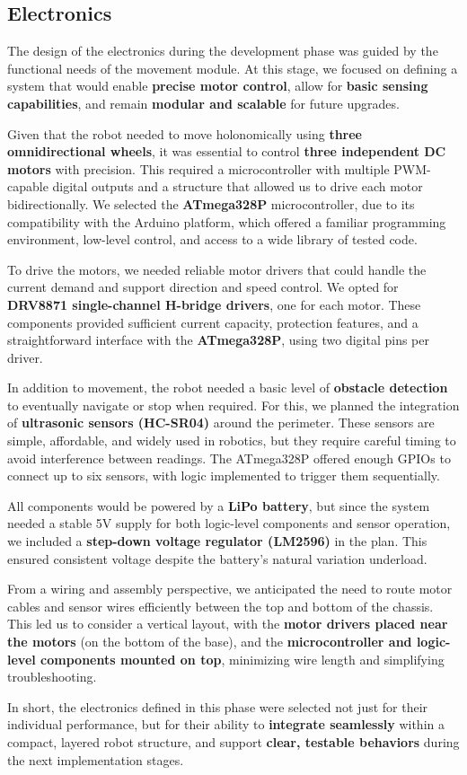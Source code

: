 \subsection{Electronics}

The design of the electronics during the development phase was guided by the functional needs of the movement module. At this stage, we focused on defining a system that would enable \textbf{precise motor control}, allow for \textbf{basic sensing capabilities}, and remain \textbf{modular and scalable} for future upgrades.

Given that the robot needed to move holonomically using \textbf{three omnidirectional wheels}, it was essential to control \textbf{three independent DC motors} with precision. This required a microcontroller with multiple PWM-capable digital outputs and a structure that allowed us to drive each motor bidirectionally. We selected the \textbf{ATmega328P} microcontroller, due to its compatibility with the Arduino platform, which offered a familiar programming environment, low-level control, and access to a wide library of tested code.

To drive the motors, we needed reliable motor drivers that could handle the current demand and support direction and speed control. We opted for \textbf{DRV8871 single-channel H-bridge drivers}, one for each motor. These components provided sufficient current capacity, protection features, and a straightforward interface with the \textbf{ATmega328P}, using two digital pins per driver.

In addition to movement, the robot needed a basic level of \textbf{obstacle detection} to eventually navigate or stop when required. For this, we planned the integration of \textbf{ultrasonic sensors (HC-SR04)} around the perimeter. These sensors are simple, affordable, and widely used in robotics, but they require careful timing to avoid interference between readings. The ATmega328P offered enough GPIOs to connect up to six sensors, with logic implemented to trigger them sequentially.

All components would be powered by a \textbf{LiPo battery}, but since the system needed a stable 5V supply for both logic-level components and sensor operation, we included a \textbf{step-down voltage regulator (LM2596)} in the plan. This ensured consistent voltage despite the battery's natural variation underload.

From a wiring and assembly perspective, we anticipated the need to route motor cables and sensor wires efficiently between the top and bottom of the chassis. This led us to consider a vertical layout, with the \textbf{motor drivers placed near the motors} (on the bottom of the base), and the \textbf{microcontroller and logic-level components mounted on top}, minimizing wire length and simplifying troubleshooting.

In short, the electronics defined in this phase were selected not just for their individual performance, but for their ability to \textbf{integrate seamlessly} within a compact, layered robot structure, and support \textbf{clear, testable behaviors} during the next implementation stages.
